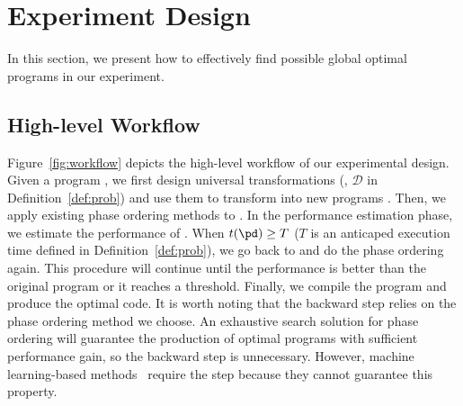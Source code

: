 \section{Experiment Design}

In this section, we present how to effectively find possible global optimal programs in our experiment. 

\subsection{High-level Workflow}
Figure~\ref{fig:workflow} depicts the high-level workflow of our experimental design. Given a program \po{}, we first design universal transformations (\ie, $\mathcal{D}$ in Definition~\ref{def:prob}) and use them to transform \po{} into new programs \pd{}. Then, we apply existing phase ordering methods to \pd{}. In the performance estimation phase, we estimate the performance of \pd{}. When $t(\pd) \geq T$ ($T$ is an anticaped execution time defined in Definition~\ref{def:prob}), we go back to \pd{} and do the phase ordering again. This procedure will continue until the performance is better than the original program or it reaches a threshold.
Finally, we compile the program and produce the optimal code. 
It is worth noting that the backward step relies on the phase ordering method we choose. An exhaustive search solution for phase ordering will guarantee the production of optimal programs with sufficient performance gain, so the backward step is unnecessary. However, machine learning-based methods~\cite{ashouri2017micomp} require the step because they cannot guarantee this property.

